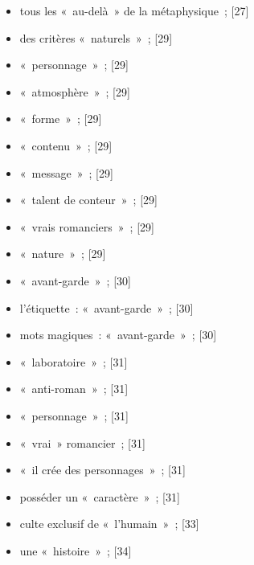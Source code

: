 \documentclass[12pt, a4paper]{article}
\begin{document}
\begin{itemize}
	\item tous les «~au-delà~» de la métaphysique{\color{gray}~; [27]}

	\item des critères «~naturels~»{\color{gray}~; [29]}

	\item «~personnage~»{\color{gray}~; [29]}

	\item «~atmosphère~»{\color{gray}~; [29]}

	\item «~forme~»{\color{gray}~; [29]}

	\item «~contenu~»{\color{gray}~; [29]}

	\item «~message~»{\color{gray}~; [29]}

	\item «~talent de conteur~»{\color{gray}~; [29]}

	\item «~vrais romanciers~»{\color{gray}~; [29]}

	\item «~nature~»{\color{gray}~; [29]}

	\item «~avant-garde~»{\color{gray}~; [30]}

	\item l’étiquette~: «~avant-garde~»{\color{gray}~; [30]}

	\item mots magiques~: «~avant-garde~»{\color{gray}~; [30]}

	\item «~laboratoire~»{\color{gray}~; [31]}

	\item «~anti-roman~»{\color{gray}~; [31]}

	\item «~personnage~»{\color{gray}~; [31]}

	\item «~vrai~» romancier{\color{gray}~; [31]}

	\item «~il crée des personnages~»{\color{gray}~; [31]}

	\item posséder un «~caractère~»{\color{gray}~; [31]}

	\item culte exclusif de «~l’humain~»{\color{gray}~; [33]}

	\item une «~histoire~»{\color{gray}~; [34]}


\end{itemize}
\end{document}
